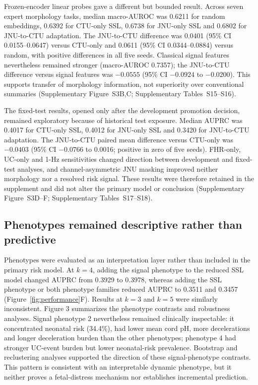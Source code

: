 \documentclass[utf8]{FrontiersinHarvard}
\begin{document}
Frozen-encoder linear probes gave a different but bounded result. Across seven expert morphology tasks, median macro-AUROC was 0.6211 for random embeddings, 0.6392 for CTU-only SSL, 0.6738 for JNU-only SSL and 0.6802 for JNU-to-CTU adaptation. The JNU-to-CTU difference was 0.0401 (95\% CI 0.0155--0.0647) versus CTU-only and 0.0611 (95\% CI 0.0344--0.0884) versus random, with positive differences in all five seeds. Classical signal features nevertheless remained stronger (macro-AUROC 0.7357); the JNU-to-CTU difference versus signal features was $-0.0555$ (95\% CI $-0.0924$ to $-0.0200$). This supports transfer of morphology information, not superiority over conventional summaries (Supplementary Figure~S3B,C; Supplementary Tables~S15--S16).

The fixed-test results, opened only after the development promotion decision, remained exploratory because of historical test exposure. Median AUPRC was 0.4017 for CTU-only SSL, 0.4012 for JNU-only SSL and 0.3420 for JNU-to-CTU adaptation. The JNU-to-CTU paired mean difference versus CTU-only was $-0.0403$ (95\% CI $-0.0766$ to 0.0016; positive in zero of five seeds). FHR-only, UC-only and 1-Hz sensitivities changed direction between development and fixed-test analyses, and channel-asymmetric JNU masking improved neither morphology nor a resolved risk signal. These results were therefore retained in the supplement and did not alter the primary model or conclusion (Supplementary Figure~S3D--F; Supplementary Tables~S17--S18).

\subsection{Phenotypes remained descriptive rather than predictive}

Phenotypes were evaluated as an interpretation layer rather than included in the primary risk model. At $k=4$, adding the signal phenotype to the reduced SSL model changed AUPRC from 0.3929 to 0.3978, whereas adding the SSL phenotype or both phenotype families reduced AUPRC to 0.3511 and 0.3457 (Figure~\ref{fig:performance}F). Results at $k=3$ and $k=5$ were similarly inconsistent. Figure 3 summarizes the phenotype contrasts and robustness analyses. Signal phenotype 2 nevertheless remained clinically inspectable: it concentrated neonatal risk (34.4\%), had lower mean cord pH, more decelerations and longer deceleration burden than the other phenotypes; phenotype 4 had stronger UC-event burden but lower neonatal-risk prevalence. Bootstrap and reclustering analyses supported the direction of these signal-phenotype contrasts. This pattern is consistent with an interpretable dynamic phenotype, but it neither proves a fetal-distress mechanism nor establishes incremental prediction.
\end{document}
